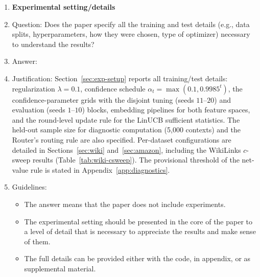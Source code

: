 \documentclass{article}
\theoremstyle{definition}
\theoremstyle{remark}
\theoremstyle{remark}
\begin{document}
\begin{enumerate}
\item {\bf Experimental setting/details}
    \item[] Question: Does the paper specify all the training and test details (e.g., data splits, hyperparameters, how they were chosen, type of optimizer) necessary to understand the results?
    \item[] Answer: \answerYes{} %
    \item[] Justification: Section~\ref{sec:exp-setup} reports all training/test details: regularization $\lambda=0.1$, confidence schedule $\alpha_t=\max(0.1, 0.9985^t)$, the confidence-parameter grids with the disjoint tuning (seeds $11$--$20$) and evaluation (seeds $1$--$10$) blocks, embedding pipelines for both feature spaces, and the round-level update rule for the LinUCB sufficient statistics. The held-out sample size for diagnostic computation (5{,}000 contexts) and the Router's routing rule are also specified. Per-dataset configurations are detailed in Sections~\ref{sec:wiki} and~\ref{sec:amazon}, including the WikiLinks $c$-sweep results (Table~\ref{tab:wiki-csweep}). The provisional threshold of the net-value rule is stated in Appendix~\ref{app:diagnostics}.
    \item[] Guidelines:
    \begin{itemize}
        \item The answer \answerNA{} means that the paper does not include experiments.
        \item The experimental setting should be presented in the core of the paper to a level of detail that is necessary to appreciate the results and make sense of them.
        \item The full details can be provided either with the code, in appendix, or as supplemental material.
    \end{itemize}


\end{enumerate}
\end{document}
